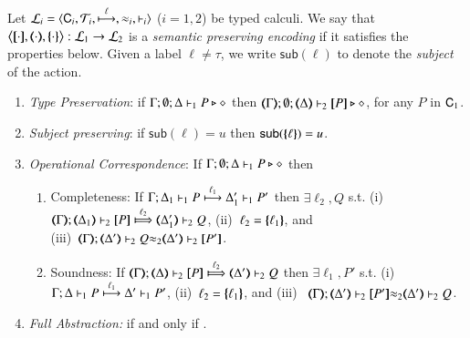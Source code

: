 \smallskip 

\begin{definition}\rm
\label{def:ep}
       Let  $\tyl{L}_i=\calc{\CAL_i}{{\cal{T}}_i}{\hby{\ell}}{\wb_i}{\proves_i}$
       ($i=1,2$) be typed calculi. 
We say that $\enco{\map{\cdot}, \mapt{\cdot}, \mapa{\cdot}}: \tyl{L}_1 \to \tyl{L}_2$ is a \emph{semantic preserving encoding}
if it satisfies the properties below.
Given a label $\ell \neq \tau$, we write 
$\mathsf{sub}(\ell)$
to denote the \emph{subject} of the action.
	
	\begin{enumerate}[1.]
		\item \emph{Type Preservation}:
	if
	$\Gamma; \emptyset; \Delta \proves_1 P \hastype \Proc$ then 
	$\mapt{\Gamma}; \emptyset; \mapt{\Delta} \proves_2 \map{P} \hastype \Proc$,  
	for any   $P$ in $\CAL_1$.
			\item \emph{Subject preserving}: if $\mathsf{sub}(\ell) = u$ then $\mathsf{sub}(\mapa{\ell}) =u$.


	\item \emph{Operational Correspondence}: If $\Gamma; \emptyset; \Delta \proves_1 P \hastype \Proc$ then
		\begin{enumerate}
			\item	Completeness: 
			   If  
$\stytraarg{\Gamma}{\ell_1}{\Delta_1}{P}{\Delta'_1}{P'}{1}$
			   then $\exists \ell_2, Q$ s.t. 
 (i)~$\wtytraarg{\mapt{\Gamma}}{\ell_2}{\mapt{\Delta_1}}{\map{P}}{\mapt{\Delta'_1}}{Q}{2}$,
			    (ii)~$\ell_2 = \mapa{\ell_1}$, 
			    and \\
				(iii)~${\mapt{\Gamma}};{\mapt{\Delta'}}\proves_2 {Q}{\wb_2}
{\mapt{\Delta'}}\proves_2 {\map{P'}}$.
				
			\item	Soundness:   
				If  $\wtytraarg{\mapt{\Gamma}}{\ell_2}{\mapt{\Delta}}{\map{P}}{\mapt{\Delta'}}{Q}{2}$
				then $\exists \ell_1, P'$ s.t.  
				(i)~$\stytraarg{\Gamma}{\ell_1}{\Delta}{P}{\Delta'}{P'}{1}$,
				(ii)~$\ell_2 = \mapa{\ell_1}$, and
				(iii)~
${\mapt{\Gamma}};{\mapt{\Delta'}}\proves_2 {\map{P'}}{\wb_2}
{\mapt{\Delta'}}\proves_2 {Q}$.

		\end{enumerate}
		
		\item \emph{Full Abstraction:} 
		if and only if
		.
		
	\end{enumerate}
\end{definition}

